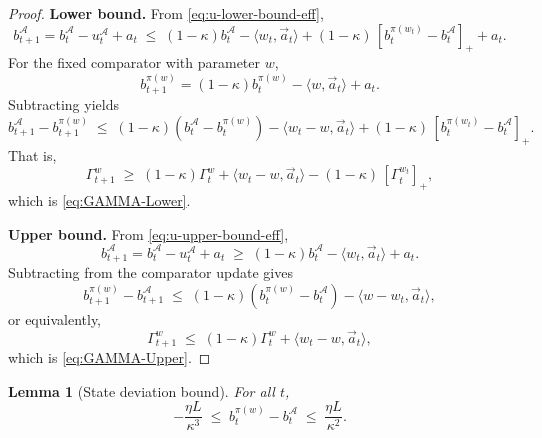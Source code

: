 \documentclass[11pt]{article}
\newtheorem{Thm:Lemma}{Lemma}
\begin{document}
\begin{proof}
\textbf{Lower bound.}  
From \eqref{eq:u-lower-bound-eff},
\[
b_{t+1}^\mathcal{A}
= b_t^\mathcal{A} - u_t^\mathcal{A} + a_t
\;\le\;
(1-\kappa)b_t^\mathcal{A} - \langle w_t,\vec{a}_t\rangle
+ (1-\kappa)\,[b_t^{\pi(w_t)}-b_t^\mathcal{A}]_+ + a_t .
\]
For the fixed comparator with parameter \(w\),
\[
b_{t+1}^{\pi(w)} = (1-\kappa)b_t^{\pi(w)} - \langle w,\vec{a}_t\rangle + a_t .
\]
Subtracting yields
\[
b_{t+1}^\mathcal{A} - b_{t+1}^{\pi(w)}
\;\le\;
(1-\kappa)(b_t^\mathcal{A}-b_t^{\pi(w)})
-\langle w_t - w,\vec{a}_t\rangle
+(1-\kappa)\,[b_t^{\pi(w_t)}-b_t^\mathcal{A}]_+ .
\]
That is,
\[
\Gamma_{t+1}^w
\;\ge\;
(1-\kappa)\Gamma_t^w
+\langle w_t - w,\vec{a}_t\rangle
-(1-\kappa)\,[\Gamma_t^{w_t}]_+,
\]
which is \eqref{eq:GAMMA-Lower}.

\medskip
\noindent
\textbf{Upper bound.}  
From \eqref{eq:u-upper-bound-eff},
\[
b_{t+1}^\mathcal{A}
= b_t^\mathcal{A} - u_t^\mathcal{A} + a_t
\;\ge\;
(1-\kappa)b_t^\mathcal{A} - \langle w_t,\vec{a}_t\rangle + a_t .
\]
Subtracting from the comparator update gives
\[
b_{t+1}^{\pi(w)} - b_{t+1}^\mathcal{A}
\;\le\;
(1-\kappa)(b_t^{\pi(w)}-b_t^\mathcal{A})
-\langle w - w_t,\vec{a}_t\rangle ,
\]
or equivalently,
\[
\Gamma_{t+1}^w
\;\le\;
(1-\kappa)\Gamma_t^w
+\langle w_t - w,\vec{a}_t\rangle ,
\]
which is \eqref{eq:GAMMA-Upper}.
\end{proof}


\begin{Thm:Lemma}[State deviation bound]
\label{lem:state-gap-bound}
For all \(t\),
\[
-\frac{\eta L}{\kappa^3}
\;\leq\;
b_t^{\pi(w)} - b_t^\mathcal{A}
\;\leq\;
\frac{\eta L}{\kappa^2}.
\]
\end{Thm:Lemma}
\end{document}
